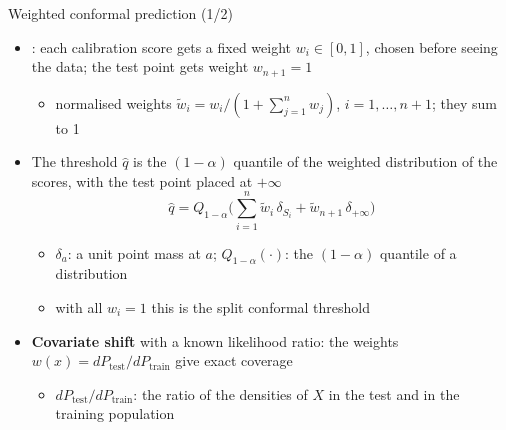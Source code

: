 \begin{frame}{Weighted conformal prediction (1/2)}
\itemsize{\small}
\begin{itemize}
    \item {}: each calibration score gets a fixed weight $w_i \in [0, 1]$, chosen before seeing the data; the test point gets weight $w_{n+1} = 1$
    \begin{itemize}
        \item normalised weights $\tilde w_i = w_i/(1 + \sum_{j=1}^n w_j)$, $i = 1, \dots, n + 1$; they sum to 1
    \end{itemize}
    \item The threshold $\hat q$ is the $(1 - \alpha)$ quantile of the weighted distribution of the scores, with the test point placed at $+\infty$ \[ \hat q = Q_{1-\alpha}\Big(\sum_{i=1}^n \tilde w_i\,\delta_{S_i} + \tilde w_{n+1}\,\delta_{+\infty}\Big) \]
    \begin{itemize}
        \item $\delta_a$: a unit point mass at $a$; $Q_{1-\alpha}(\cdot)$: the $(1 - \alpha)$ quantile of a distribution
        \item with all $w_i = 1$ this is the split conformal threshold
    \end{itemize}
    \item \textbf{Covariate shift} with a known likelihood ratio: the weights $w(x) = dP_{\mathrm{test}}/dP_{\mathrm{train}}$ give exact coverage 
    \begin{itemize}
        \item $dP_{\mathrm{test}}/dP_{\mathrm{train}}$: the ratio of the densities of $X$ in the test and in the training population
    \end{itemize}
\end{itemize}
\end{frame}

